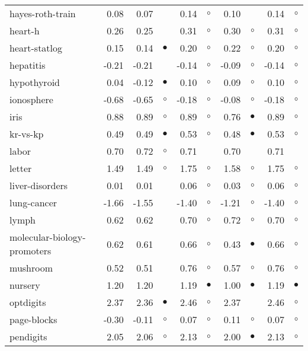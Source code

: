 {\begin{longtable}{lrr@{\hspace{0.1cm}}cr@{\hspace{0.1cm}}cr@{\hspace{0.1cm}}cr@{\hspace{0.1cm}}c}
hayes-roth-train &  0.08 &  0.07 &            &  0.14 &   $\circ$ &  0.10 &           &  0.14 &   $\circ$\\
heart-h &  0.26 &  0.25 &            &  0.31 &   $\circ$ &  0.30 &   $\circ$ &  0.31 &   $\circ$\\
heart-statlog &  0.15 &  0.14 &  $\bullet$ &  0.20 &   $\circ$ &  0.22 &   $\circ$ &  0.20 &   $\circ$\\
hepatitis & -0.21 & -0.21 &            & -0.14 &   $\circ$ & -0.09 &   $\circ$ & -0.14 &   $\circ$\\
hypothyroid &  0.04 & -0.12 &  $\bullet$ &  0.10 &   $\circ$ &  0.09 &   $\circ$ &  0.10 &   $\circ$\\
ionosphere & -0.68 & -0.65 &    $\circ$ & -0.18 &   $\circ$ & -0.08 &   $\circ$ & -0.18 &   $\circ$\\
iris &  0.88 &  0.89 &    $\circ$ &  0.89 &   $\circ$ &  0.76 & $\bullet$ &  0.89 &   $\circ$\\
kr-vs-kp &  0.49 &  0.49 &  $\bullet$ &  0.53 &   $\circ$ &  0.48 & $\bullet$ &  0.53 &   $\circ$\\
labor &  0.70 &  0.72 &    $\circ$ &  0.71 &           &  0.70 &           &  0.71 &          \\
letter &  1.49 &  1.49 &    $\circ$ &  1.75 &   $\circ$ &  1.58 &   $\circ$ &  1.75 &   $\circ$\\
liver-disorders &  0.01 &  0.01 &            &  0.06 &   $\circ$ &  0.03 &   $\circ$ &  0.06 &   $\circ$\\
lung-cancer & -1.66 & -1.55 &            & -1.40 &   $\circ$ & -1.21 &   $\circ$ & -1.40 &   $\circ$\\
lymph &  0.62 &  0.62 &            &  0.70 &   $\circ$ &  0.72 &   $\circ$ &  0.70 &   $\circ$\\
molecular-biology-promoters &  0.62 &  0.61 &            &  0.66 &   $\circ$ &  0.43 & $\bullet$ &  0.66 &   $\circ$\\
mushroom &  0.52 &  0.51 &            &  0.76 &   $\circ$ &  0.57 &   $\circ$ &  0.76 &   $\circ$\\
nursery &  1.20 &  1.20 &            &  1.19 & $\bullet$ &  1.00 & $\bullet$ &  1.19 & $\bullet$\\
optdigits &  2.37 &  2.36 &  $\bullet$ &  2.46 &   $\circ$ &  2.37 &           &  2.46 &   $\circ$\\
page-blocks & -0.30 & -0.11 &    $\circ$ &  0.07 &   $\circ$ &  0.11 &   $\circ$ &  0.07 &   $\circ$\\
pendigits &  2.05 &  2.06 &    $\circ$ &  2.13 &   $\circ$ &  2.00 & $\bullet$ &  2.13 &   $\circ$\\

\end{longtable}}
